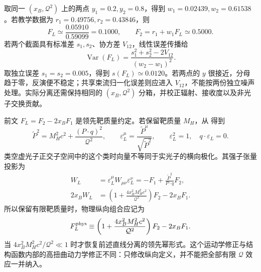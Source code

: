 \begin{exbox}[纵向响应的数值提取与误差]
取同一 $(x_B,\mathcal Q^2)$ 上的两点 $y_1=0.2,y_2=0.8$，得到
$w_1=0.02439,w_2=0.61538$。若教学数据为 $r_1=0.49756,r_2=0.43846$，则
\begin{equation*}
 F_L\simeq\frac{0.05910}{0.59099}=0.1000,\qquad
 F_2=r_1+w_1F_L\simeq0.5000.
\end{equation*}
若两个截面具有标准差 $s_1,s_2$、协方差 $V_{12}$，线性误差传播给
\begin{equation*}
 \operatorname{Var}(F_L)
 =\frac{s_1^2+s_2^2-2V_{12}}{(w_2-w_1)^2}.
\end{equation*}
取独立误差 $s_1=s_2=0.005$，得到 $s(F_L)\simeq0.0120$。若两点的 $y$ 很接近，分母趋于零，反演便不稳定；共享束流归一化误差则应进入 $V_{12}$，不能按两份独立噪声处理。实际分离还需保持相同的 $(x_B,\mathcal Q^2)$ 分箱，并校正辐射、接收度以及非光子交换贡献。
\end{exbox}

\begin{derivation}[有限靶质量的纵向投影]
前文 $F_L=F_2-2x_BF_1$ 是领先靶质量约定。若保留靶质量 $M_H$，从 得到
\begin{equation*}
 \widetilde P^2=M_H^2c^2+\frac{(P\cdot q)^2}{\mathcal Q^2},\qquad
 \varepsilon_L^\mu=\frac{\widetilde P^\mu}{\sqrt{\widetilde P^2}},\qquad
 \varepsilon_L^2=1,\quad q\cdot\varepsilon_L=0.
\end{equation*}
类空虚光子正交子空间中的这个类时向量不等同于实光子的横向极化。其强子张量投影为
\begin{align*}
 W_L&=\varepsilon_L^\mu W_{\mu\nu}\varepsilon_L^\nu
 =-F_1+\frac{\widetilde P^2}{P\cdot q}F_2,\\
 2x_BW_L&=\left(1+\frac{4x_B^2M_H^2c^2}{\mathcal Q^2}\right)F_2-2x_BF_1.
\end{align*}
所以保留有限靶质量时，物理纵向组合应记为
\begin{equation}
 F_L^{\rm phys}\equiv
 \left(1+\frac{4x_B^2M_H^2c^2}{\mathcal Q^2}\right)F_2-2x_BF_1.
 \label{eq:dis-longitudinal-target-mass}
\end{equation}
当 $4x_B^2M_H^2c^2/\mathcal Q^2\ll1$ 时才恢复前述直线分离的领先幂形式。这个运动学修正与结构函数内部的高扭曲动力学修正不同：只修改纵向定义，并不能把全部有限 $\mathcal Q$ 效应一并纳入。
\end{derivation}

